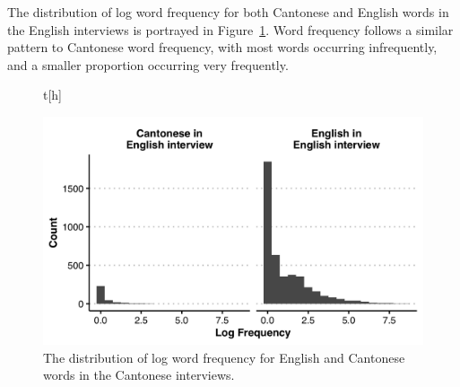 The distribution of log word frequency for both Cantonese and English words in the English interviews is portrayed in Figure~\ref{ch2:fig:englishwordfrequency}. Word frequency follows a similar pattern to Cantonese word frequency, with most words occurring infrequently, and a smaller proportion occurring very frequently.

\begin{figure}t[h]
  \begin{center}
  \includegraphics[width=4.9in]{figures/ch2_englishwordfrequency_5in.png} 
  \caption{The distribution of log word frequency for English and Cantonese words in the Cantonese interviews.}
  \label{ch2:fig:englishwordfrequency}
  \end{center}
\end{figure}

